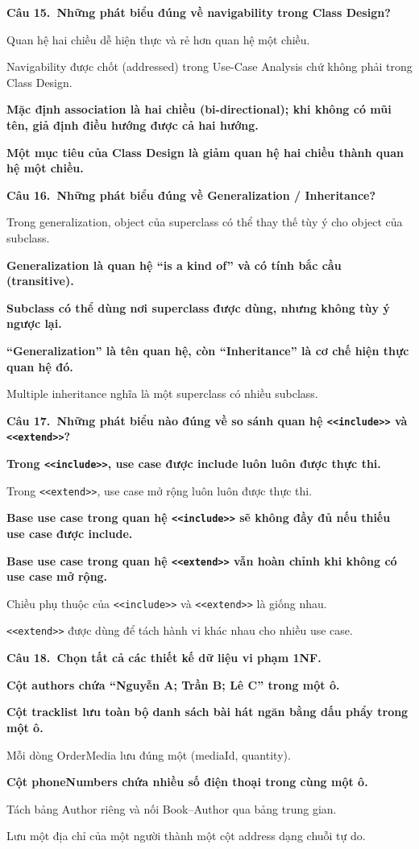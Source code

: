 \documentclass[11pt,a4paper]{article}
\newcommand{\cau}[2]{\par\vspace{2pt}\noindent\textbf{Câu #1.\ #2}\par\vspace{1pt}}
\newenvironment{pa}{\begin{list}{}{\leftmargin=0.95cm\labelwidth=0.5cm\labelsep=0.3cm\itemsep=1pt\parsep=0pt\topsep=0pt\partopsep=0pt}}{\end{list}}
\newcommand{\A}{\item[A.]}
\newcommand{\B}{\item[B.]}
\newcommand{\C}{\item[C.]}
\newcommand{\D}{\item[D.]}
\newcommand{\E}{\item[E.]}
\newcommand{\F}{\item[F.]}
\begin{document}
\cau{15}{Những phát biểu đúng về navigability trong Class Design?}
\begin{pa}
  \A Quan hệ hai chiều dễ hiện thực và rẻ hơn quan hệ một chiều.
  \B Navigability được chốt (addressed) trong Use-Case Analysis chứ không phải trong Class Design.
  \C {\bfseries Mặc định association là hai chiều (bi-directional); khi không có mũi tên, giả định điều hướng được cả hai hướng.}
  \D {\bfseries Một mục tiêu của Class Design là giảm quan hệ hai chiều thành quan hệ một chiều.}
\end{pa}

\cau{16}{Những phát biểu đúng về Generalization / Inheritance?}
\begin{pa}
\A Trong generalization, object của superclass có thể thay thế tùy ý cho object của subclass.
\B {\bfseries Generalization là quan hệ ``is a kind of'' và có tính bắc cầu (transitive).}
\C {\bfseries Subclass có thể dùng nơi superclass được dùng, nhưng không tùy ý ngược lại.}
\D {\bfseries ``Generalization'' là tên quan hệ, còn ``Inheritance'' là cơ chế hiện thực quan hệ đó.}
\E Multiple inheritance nghĩa là một superclass có nhiều subclass.
\end{pa}

\cau{17}{Những phát biểu nào đúng về so sánh quan hệ \texttt{<<include>>} và \texttt{<<extend>>}?}
\begin{pa}
\A {\bfseries Trong \texttt{<<include>>}, use case được include luôn luôn được thực thi.}
  \B Trong \texttt{<<extend>>}, use case mở rộng luôn luôn được thực thi.
  \C {\bfseries Base use case trong quan hệ \texttt{<<include>>} sẽ không đầy đủ nếu thiếu use case được include.}
  \D {\bfseries Base use case trong quan hệ \texttt{<<extend>>} vẫn hoàn chỉnh khi không có use case mở rộng.}
  \E Chiều phụ thuộc của \texttt{<<include>>} và \texttt{<<extend>>} là giống nhau.
  \F \texttt{<<extend>>} được dùng để tách hành vi khác nhau cho nhiều use case.
\end{pa}

\cau{18}{Chọn tất cả các thiết kế dữ liệu vi phạm 1NF.}
\begin{pa}
\A {\bfseries Cột authors chứa ``Nguyễn A; Trần B; Lê C'' trong một ô.}
\B {\bfseries Cột tracklist lưu toàn bộ danh sách bài hát ngăn bằng dấu phẩy trong một ô.}
\C Mỗi dòng OrderMedia lưu đúng một (mediaId, quantity).
\D {\bfseries Cột phoneNumbers chứa nhiều số điện thoại trong cùng một ô.}
\E Tách bảng Author riêng và nối Book--Author qua bảng trung gian.
\F Lưu một địa chỉ của một người thành một cột address dạng chuỗi tự do.
\end{pa}
\end{document}
